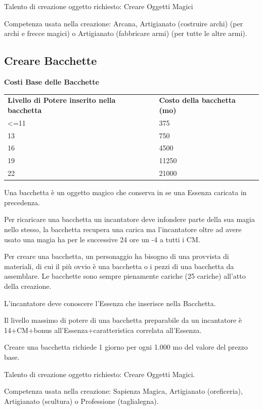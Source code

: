 \documentclass[a4paper,11pt,twoside,openany]{book}
\begin{document}
Talento di creazione oggetto richiesto: Creare Oggetti Magici

Competenza usata nella creazione: Arcana, Artigianato (costruire archi) (per archi e frecce magici) o Artigianato (fabbricare armi) (per tutte le altre armi).

\subsection{Creare Bacchette}

\bigskip

\textbf{Costi Base delle Bacchette}

\begin{tabular}{ll}
	\toprule
	\textbf{Livello di Potere inserito nella bacchetta} & \textbf{Costo della bacchetta (mo)}\tabularnewline
	\textless=11                                        & 375\tabularnewline
	13                                                  & 750\tabularnewline
	16                                                  & 4500\tabularnewline
	19                                                  & 11250\tabularnewline
	22                                                  & 21000\tabularnewline
\end{tabular}

\bigskip

Una bacchetta è un oggetto magico che conserva in se una Essenza caricata in precedenza.

Per ricaricare una bacchetta un incantatore deve infondere parte della sua magia nello stesso, la bacchetta recupera una carica ma l'incantatore oltre ad avere usato una magia ha per le successive 24 ore un -4 a tutti i CM.

Per creare una bacchetta, un personaggio ha bisogno di una provvista di materiali, di cui il più ovvio è una bacchetta o i pezzi di una bacchetta da assemblare. Le bacchette sono sempre pienamente cariche (25 cariche) all'atto della creazione.

L'incantatore deve conoscere l'Essenza che inserisce nella Bacchetta.

Il livello massimo di potere di una bacchetta preparabile da un incantatore è 14+CM+bonus all'Essenza+caratteristica correlata all'Essenza.

Creare una bacchetta richiede 1 giorno per ogni 1.000 mo del valore del prezzo base.

Talento di creazione oggetto richiesto: Creare Oggetti Magici.

Competenza usata nella creazione: Sapienza Magica, Artigianato (oreficeria),
Artigianato (scultura) o Professione (taglialegna).
\end{document}
